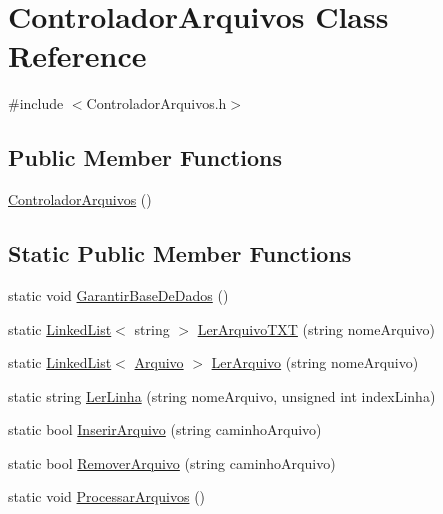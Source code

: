 \hypertarget{class_controlador_arquivos}{}\section{Controlador\+Arquivos Class Reference}
\label{class_controlador_arquivos}


{\ttfamily \#include $<$Controlador\+Arquivos.\+h$>$}

\subsection*{Public Member Functions}
\begin{DoxyCompactItemize}
\item 
\hyperlink{class_controlador_arquivos_a668b096f9467d8464ae9e38595976883}{Controlador\+Arquivos} ()
\end{DoxyCompactItemize}
\subsection*{Static Public Member Functions}
\begin{DoxyCompactItemize}
\item 
static void \hyperlink{class_controlador_arquivos_a18d1b21310b0e72d241623d3d81d0165}{Garantir\+Base\+De\+Dados} ()
\item 
static \hyperlink{class_linked_list}{Linked\+List}$<$ string $>$ \hyperlink{class_controlador_arquivos_a965507d91d5a7b0622c6d5c97ae1ce7e}{Ler\+Arquivo\+T\+XT} (string nome\+Arquivo)
\item 
static \hyperlink{class_linked_list}{Linked\+List}$<$ \hyperlink{class_arquivo}{Arquivo} $>$ \hyperlink{class_controlador_arquivos_a04ad61d5ca3f38cacc90d282f441384b}{Ler\+Arquivo} (string nome\+Arquivo)
\item 
static string \hyperlink{class_controlador_arquivos_a3946ae4d7ac2caef9bec2d7ba498ec34}{Ler\+Linha} (string nome\+Arquivo, unsigned int index\+Linha)
\item 
static bool \hyperlink{class_controlador_arquivos_ac4120123f997d42eaa075da393ca6e02}{Inserir\+Arquivo} (string caminho\+Arquivo)
\item 
static bool \hyperlink{class_controlador_arquivos_ac42745df8ad573381dadf68027970e6b}{Remover\+Arquivo} (string caminho\+Arquivo)
\item 
static void \hyperlink{class_controlador_arquivos_ad282054256f449019ae353f834eb44e0}{Processar\+Arquivos} ()
\end{DoxyCompactItemize}


